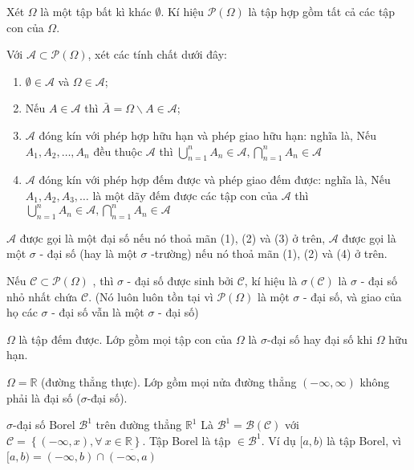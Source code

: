 Xét $\Omega$ là một tập bất kì khác $\emptyset$. Kí hiệu $\mathcal{P}(\Omega)$ là tập hợp gồm tất cả các tập con của $\Omega$.

Với $\mathscr{A} \subset \mathcal{P}(\Omega)$, xét các tính chất dưới đây:
\begin{enumerate}[\qquad 1{)}]
	\item $\emptyset \in \mathscr{A}$ và $\Omega \in \mathscr{A}$; 
	
	\item Nếu $A \in \mathscr{A} $  thì $\bar{A} = \Omega \backslash A \in \mathscr{A} $; 
	
	\item $\mathscr{A}$ đóng kín với phép hợp hữu hạn và phép giao hữu hạn: nghĩa là, Nếu $ A_1, A_2, \ldots, A_n $ đều thuộc $\mathscr{A}$ thì $\bigcup\limits_{n = 1}^n  {{A_n}} \in \mathscr{A}, \bigcap\limits_{n = 1}^n  {A_n} \in \mathscr{A}$
	
	\item $\mathscr{A}$ đóng kín với phép hợp đếm được và phép giao đếm được: nghĩa là, Nếu $ A_1, A_2, A_3, \ldots$  là một dãy đếm được các tập con của  $\mathscr{A}$ thì $\bigcup\limits_{n = 1}^n  {{A_n}} \in \mathscr{A}, \bigcap\limits_{n = 1}^n  {A_n} \in \mathscr{A}$
\end{enumerate}

\begin{DN}
	$\mathscr{A}$ được gọi là một đại số nếu nó thoả mãn (1), (2) và (3)  ở trên, $\mathscr{A}$ được gọi là một $\sigma$ - đại số (hay là một $\sigma$ -trường) nếu nó thoả mãn (1), (2) và (4) ở trên. 
	\end{DN}

\begin{DN}
	Nếu $\mathscr{C} \subset \mathcal{P}(\Omega)$ ,  thì $\sigma$ - đại số được sinh bởi $\mathscr{C}$, kí hiệu là $\sigma \left (\mathscr{C}\right)$ là $\sigma$ - đại số nhỏ nhất chứa $\mathscr{C}$. (Nó luôn luôn tồn tại vì $\mathcal{P}(\Omega)$ là một  $\sigma$ - đại số, và giao của họ các $\sigma$ - đại số vẫn là một $\sigma $ - đại số)
\end{DN}

\begin{VD}
		$\Omega$ là tập đếm được. Lớp gồm mọi tập con của $\Omega$ là $\sigma$-đại số hay đại số khi $\Omega$ hữu hạn.
	\end{VD}

\begin{VD}
	$\Omega = \mathbb{R}$ (đường thẳng thực). Lớp gồm mọi nửa đường thẳng $(-\infty, \infty)$ không phải là đại số ($\sigma$-đại số).
\end{VD}
\begin{VD}
	$\sigma$-đại số Borel $\mathcal{B}^1$ trên đường thẳng $\mathbb{R}^1$
Là $\mathcal{B}^1=\mathcal{B}(\mathscr{C})$ với $\mathscr{C}=\left\{ (-\infty,x),\forall\ x \in \mathbb{R} \right\}$. Tập Borel là tập $\in \mathcal{B}^1$. Ví dụ $[a,b)$ là tập Borel, vì $[a,b)=(-\infty,b)\cap \overline{(-\infty,a)}$
	\end{VD}

